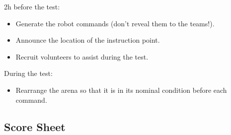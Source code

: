 2h before the test:
\begin{itemize}[nosep]
	\item Generate the robot commands (don't reveal them to the teams!).
	\item Announce the location of the instruction point.
	\item Recruit volunteers to assist during the test.
	\newline
\end{itemize}

\noindent During the test:
\begin{itemize}[nosep]
	\item Rearrange the arena so that it is in its nominal condition before each command.
\end{itemize}

\subsection*{Score Sheet}


